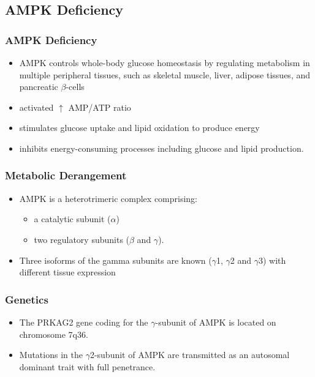 \documentclass{scrartcl}
\begin{document}
\subsection{AMPK Deficiency}
\label{sec:orga8fcb92}
\subsubsection{AMPK Deficiency}
\label{sec:orgaab49cd}
\begin{itemize}
\item AMPK controls whole-body glucose homeostasis by regulating metabolism in multiple peripheral tissues, such as
skeletal muscle, liver, adipose tissues, and pancreatic \(\beta\)-cells
\item activated \(\uparrow\) AMP/ATP ratio
\item stimulates glucose uptake and lipid oxidation to produce energy
\item inhibits energy-consuming processes including glucose and lipid production.
\end{itemize}

\subsubsection{Metabolic Derangement}
\label{sec:orga3f962e}
\begin{itemize}
\item AMPK is a heterotrimeric complex comprising:
\begin{itemize}
\item a catalytic subunit (\(\alpha\))
\item two regulatory subunits (\(\beta\) and \(\gamma\)).
\end{itemize}
\item Three isoforms of the gamma subunits are known (\(\gamma\)1, \(\gamma\)2 and \(\gamma\)3) with different tissue
expression
\end{itemize}

\subsubsection{Genetics}
\label{sec:org904d151}
\begin{itemize}
\item The PRKAG2 gene coding for the \(\gamma\)-subunit of AMPK is located on chromosome 7q36.
\item Mutations in the \(\gamma\)2-subunit of AMPK are transmitted as an
autosomal dominant trait with full penetrance.
\end{itemize}
\end{document}
